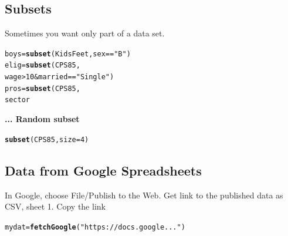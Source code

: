 \documentclass{report}\usepackage{graphicx, color}
\makeatletter
\newcommand{\hlfunctioncall}[1]{\textcolor[rgb]{0.501960784313725,0,0.329411764705882}{\textbf{#1}}}%
\newcommand{\hlstring}[1]{\textcolor[rgb]{0.6,0.6,1}{#1}}%
\newenvironment{kframe}{%
 \def\at@end@of@kframe{}%
 \ifinner\ifhmode%
  \def\at@end@of@kframe{\end{minipage}}%
  \begin{minipage}{\columnwidth}%
 \fi\fi%
 \def\FrameCommand##1{\hskip\@totalleftmargin \hskip-\fboxsep
 \colorbox{shadecolor}{##1}\hskip-\fboxsep
     \hskip-\linewidth \hskip-\@totalleftmargin \hskip\columnwidth}%
 \MakeFramed {\advance\hsize-\width
   \@totalleftmargin\z@ \linewidth\hsize
   \@setminipage}}%
 {\par\unskip\endMakeFramed%
 \at@end@of@kframe}
\newenvironment{knitrout}{}{} %
\makeatother
\begin{document}
\begin{multicols}{4}
\vspace*{-.2in}

\subsection*{Subsets}
Sometimes you want only part of a data set.

\vspace*{-.1in}

\begin{knitrout}
\color{fgcolor}\begin{kframe}
\begin{alltt}
boys = \hlfunctioncall{subset}(KidsFeet, sex==\hlstring{"B"})
elig = \hlfunctioncall{subset}(CPS85, 
        wage>10 & married==\hlstring{"Single"})
pros = \hlfunctioncall{subset}(CPS85, 
  sector %
\end{alltt}
\end{kframe}
\end{knitrout}

{\bf ... Random subset}

\vspace*{-.1in}
\begin{knitrout}
\color{fgcolor}\begin{kframe}
\begin{alltt}
\hlfunctioncall{subset}(CPS85, size = 4)
\end{alltt}
\end{kframe}
\end{knitrout}


\vspace*{-.2in}

\subsection*{Data from Google Spreadsheets}
In Google, choose {\sc File/Publish to the Web}.
Get link to the published data as CSV, sheet 1.  
Copy the link

\vspace*{-.1in}
\begin{knitrout}
\color{fgcolor}\begin{kframe}
\begin{alltt}
mydat=\hlfunctioncall{fetchGoogle}(\hlstring{"https://docs.google..."})
\end{alltt}
\end{kframe}
\end{knitrout}



\end{multicols}
\end{document}
